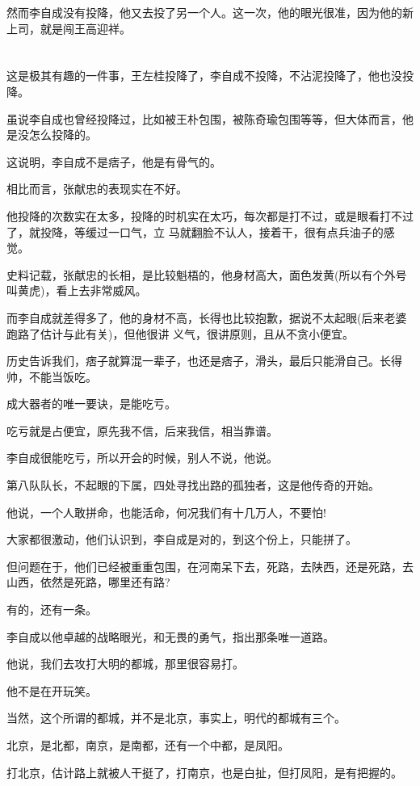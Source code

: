 \documentclass[11pt,a4paper,onecolumn]{article}
\begin{document}
然而李自成没有投降，他又去投了另一个人。这一次，他的眼光很准，因为他的新上司，就是闯王高迎祥。

\section[\thesection]{}

这是极其有趣的一件事，王左桂投降了，李自成不投降，不沾泥投降了，他也没投降。

虽说李自成也曾经投降过，比如被王朴包围，被陈奇瑜包围等等，但大体而言，他是没怎么投降的。

这说明，李自成不是痞子，他是有骨气的。

相比而言，张献忠的表现实在不好。

他投降的次数实在太多，投降的时机实在太巧，每次都是打不过，或是眼看打不过了，就投降，等缓过一口气，立
马就翻脸不认人，接着干，很有点兵油子的感觉。

史料记载，张献忠的长相，是比较魁梧的，他身材高大，面色发黄(所以有个外号叫黄虎)，看上去非常威风。

而李自成就差得多了，他的身材不高，长得也比较抱歉，据说不太起眼(后来老婆跑路了估计与此有关)，但他很讲
义气，很讲原则，且从不贪小便宜。

历史告诉我们，痞子就算混一辈子，也还是痞子，滑头，最后只能滑自己。长得帅，不能当饭吃。

成大器者的唯一要诀，是能吃亏。

吃亏就是占便宜，原先我不信，后来我信，相当靠谱。

李自成很能吃亏，所以开会的时候，别人不说，他说。

第八队队长，不起眼的下属，四处寻找出路的孤独者，这是他传奇的开始。

他说，一个人敢拼命，也能活命，何况我们有十几万人，不要怕!

大家都很激动，他们认识到，李自成是对的，到这个份上，只能拼了。

但问题在于，他们已经被重重包围，在河南呆下去，死路，去陕西，还是死路，去山西，依然是死路，哪里还有路?

有的，还有一条。

李自成以他卓越的战略眼光，和无畏的勇气，指出那条唯一道路。

他说，我们去攻打大明的都城，那里很容易打。

他不是在开玩笑。

当然，这个所谓的都城，并不是北京，事实上，明代的都城有三个。

北京，是北都，南京，是南都，还有一个中都，是凤阳。

打北京，估计路上就被人干挺了，打南京，也是白扯，但打凤阳，是有把握的。
\end{document}
